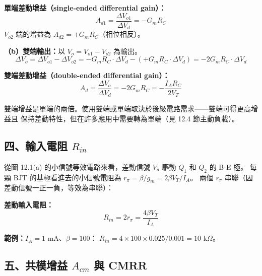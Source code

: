 \documentclass[12pt]{article}
\begin{document}
\begin{formulabox}
\textbf{單端差動增益（single-ended differential gain）：}
\[
  A_{d1} = \frac{\Delta V_{o1}}{\Delta V_d} = -G_m R_C \tag{12.10}
\]
$V_{o2}$ 端的增益為 $A_{d2} = +G_m R_C$（相位相反）。
\end{formulabox}

\noindent\textbf{（b）雙端輸出：}以 $V_o = V_{o1} - V_{o2}$ 為輸出。
\[
  \Delta V_o = \Delta V_{o1} - \Delta V_{o2} = -G_m R_C \cdot \Delta V_d - (+G_m R_C \cdot \Delta V_d) = -2G_m R_C \cdot \Delta V_d
\]

\begin{formulabox}
\textbf{雙端差動增益（double-ended differential gain）：}
\[
  A_d = \frac{\Delta V_o}{\Delta V_d} = -2G_m R_C = -\frac{I_A R_C}{2V_T} \tag{12.13}
\]
\end{formulabox}

\noindent 雙端增益是單端的兩倍。使用雙端或單端取決於後級電路需求——雙端可得更高增益且
保持差動特性，但在許多應用中需要轉為單端（見 12.4 節主動負載）。

\subsection*{四、輸入電阻 $R_{in}$}

從圖 12.1(a) 的小信號等效電路來看，差動信號 $V_d$ 驅動 $Q_1$ 和 $Q_2$ 的 B-E 極。
每顆 BJT 的基極看進去的小信號電阻為 $r_\pi = \beta / g_m = 2\beta V_T / I_A$。
兩個 $r_\pi$ 串聯（因差動信號一正一負，等效為串聯）：

\begin{formulabox}
\textbf{差動輸入電阻：}
\[
  R_{in} = 2r_\pi = \frac{4\beta V_T}{I_A} \tag{12.16}
\]
\end{formulabox}

\noindent\textbf{範例：}$I_A = 1$ mA、$\beta = 100$：
$R_{in} = 4 \times 100 \times 0.025 / 0.001 = 10$ k$\Omega$。

\subsection*{五、共模增益 $A_{cm}$ 與 CMRR}
\end{document}
